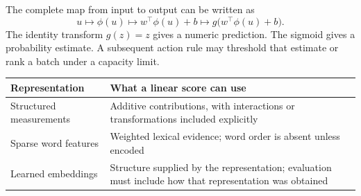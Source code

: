 The complete map from input to output can be written as
\[
u\longmapsto\phi(u)\longmapsto w^\top\phi(u)+b\longmapsto g\bigl(w^\top\phi(u)+b\bigr).
\]
The identity transform $g(z)=z$ gives a numeric prediction. The sigmoid gives a probability estimate. A subsequent action rule may threshold that estimate or rank a batch under a capacity limit.

\par\addvspace{\intextsep}\noindent\begin{minipage}{\linewidth}
\centering
{}
\label{fig:linear-model-pipeline}
\end{minipage}\par\addvspace{\intextsep}

\par\addvspace{\intextsep}\noindent\begin{minipage}{\linewidth}
\centering\small
\begin{tabular}{@{}L{3.35cm}L{6.85cm}@{}}
\toprule
Representation & What a linear score can use \\
\midrule
Structured measurements & Additive contributions, with interactions or transformations included explicitly \\
Sparse word features & Weighted lexical evidence; word order is absent unless encoded \\
Learned embeddings & Structure supplied by the representation; evaluation must include how that representation was obtained \\
\bottomrule
\end{tabular}
\label{tab:linear-model-regimes}
\end{minipage}\par\addvspace{\intextsep}

